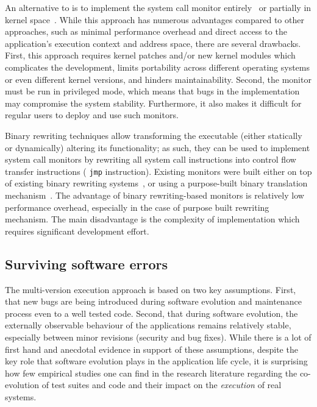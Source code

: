 
An alternative to \ptrace is to implement the system call monitor
entirely~\cite{provos2002,cox2006} or partially in kernel space~\cite{ostia}.
While this approach has numerous advantages compared to other approaches, such
as minimal performance overhead and direct access to the application's
execution context and address space, there are several drawbacks.  First, this
approach requires kernel patches and/or new kernel modules which complicates
the development, limits portability across different operating systems or even
different kernel versions, and hinders maintainability. Second, the monitor
must be run in privileged mode, which means that bugs in the implementation may
compromise the system stability. Furthermore, it also makes it difficult for
regular users to deploy and use such monitors.

Binary rewriting techniques allow transforming the executable (either statically
or dynamically) altering its functionality; as such, they can be used to
implement system call monitors by rewriting all system call instructions into 
control flow transfer instructions (\eg
\lstinline[language={[x64]Assembler}]`jmp` instruction). Existing monitors were
built either on top of existing binary rewriting
systems~\cite{onlinevalidation}, or using a purpose-built binary translation
mechanism~\cite{vx32}. The advantage of binary rewriting-based monitors is
relatively low performance overhead, especially in the case of purpose built
rewriting mechanism. The main disadvantage is the complexity of implementation
which requires significant development effort.

\subsection{Surviving software errors}


The multi-version execution approach is based on two key assumptions.  First,
that new bugs are being introduced during software evolution and maintenance
process even to a well tested code. Second, that during software evolution,
the externally observable behaviour of the applications remains relatively
stable, especially between minor revisions (\ie security and bug fixes).  While
there is a lot of first hand and anecdotal evidence in support of these
assumptions, despite the key role that software evolution plays in the
application life cycle, it is surprising how few empirical studies one can find
in the research literature regarding the co-evolution of test suites and code
and their impact on the \emph{execution} of real systems.



